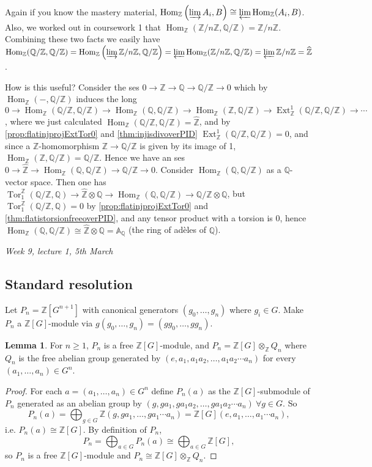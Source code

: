 \documentclass{article}
\newcommand{\A}{\mathbb{A}}
\newcommand{\Z}{\mathbb{Z}}
\newcommand{\Q}{\mathbb{Q}}
\newcommand{\Hom}{\operatorname{Hom}}
\newcommand{\Tor}{\operatorname{Tor}}
\newcommand{\Ext}{\operatorname{Ext}}
\newcommand{\zhat}{\widehat{\Z}}
\theoremstyle{definition}
\newtheorem{lemma}[defn]{Lemma}
\begin{document}
Again if you know the mastery material, $\Hom_\Z\left(\varinjlim A_i,B\right)\cong\varprojlim \Hom_\Z(A_i,B)$. Also, we worked out in coursework 1 that $\Hom_\Z(\Z/n\Z,\Q/\Z)=\Z/n\Z$. Combining these two facts we easily have $\Hom_\Z(\Q/\Z,\Q/\Z)=\Hom_\Z\left(\varinjlim\Z/n\Z,\Q/\Z\right)=\varprojlim \Hom_\Z(\Z/n\Z,\Q/\Z)=\varprojlim \Z/n\Z=\zhat$.

How is this useful? Consider the ses $0\rightarrow\Z\rightarrow\Q\rightarrow\Q/\Z\rightarrow 0$ which by $\Hom_\Z(-,\Q/\Z)$ induces the long $0\rightarrow\Hom_\Z(\Q/\Z,\Q/\Z)\rightarrow\Hom_\Z(\Q,\Q/\Z)\rightarrow\Hom_\Z(\Z,\Q/\Z)\rightarrow\Ext_\Z^1(\Q/\Z,\Q/\Z)\rightarrow\cdots$, where we just calculated $\Hom_\Z(\Q/\Z,\Q/\Z)=\zhat$, and by \ref{prop:flatinjprojExtTor0} and \ref{thm:injisdivoverPID} $\Ext_\Z^1(\Q/\Z,\Q/\Z)=0$, and since a $\Z$-homomorphism $\Z\rightarrow\Q/\Z$ is given by its image of 1, $\Hom_\Z(\Z,\Q/\Z)=\Q/\Z$. Hence we have an ses $0\rightarrow\zhat\rightarrow\Hom_\Z(\Q,\Q/\Z)\rightarrow\Q/\Z\rightarrow 0$. Consider $\Hom_\Z(\Q,\Q/\Z)$ as a $\Q$-vector space. Then one has $\Tor_1^\Z(\Q/\Z,\Q)\rightarrow\zhat\otimes\Q\rightarrow\Hom_\Z(\Q,\Q/\Z)\rightarrow\Q/\Z\otimes\Q$, but $\Tor_1^\Z(\Q/\Z,\Q)=0$ by \ref{prop:flatinjprojExtTor0} and \ref{thm:flatistorsionfreeoverPID}, and any tensor product with a torsion is 0, hence $\Hom_\Z(\Q,\Q/\Z)\cong\zhat\otimes\Q=\A_\Q$ (the ring of adèles of $\Q$).

\begin{flushright}
\textit{Week 9, lecture 1, 5th March}
\end{flushright}

\subsection{Standard resolution}

Let $P_n=\Z[G^{n+1}]$ with canonical generators $(g_0,\ldots,g_n)$ where $g_i\in G$. Make $P_n$ a $\Z[G]$-module via $g(g_0,\ldots,g_n)=(gg_0,\ldots,gg_n)$.

\begin{lemma}
For $n\geq 1$, $P_n$ is a free $\Z[G]$-module, and $P_n=\Z[G]\otimes_\Z Q_n$ where $Q_n$ is the free abelian group generated by $(e,a_1,a_1a_2,\ldots,a_1a_2\cdots a_n)$ for every $(a_1,\ldots,a_n)\in G^n$. 
\end{lemma}
\begin{proof}
For each $a=(a_1,\ldots,a_n)\in G^n$ define $P_n(a)$ as the $\Z[G]$-submodule of $P_n$ generated as an abelian group by $(g,ga_1,ga_1a_2,\ldots,ga_1a_2\cdots a_n) \ \forall g\in G$. So
\[
P_n(a)=\bigoplus_{g\in G}\Z (g,ga_1,\ldots,ga_1\cdots a_n)=\Z[G](e,a_1,\ldots,a_1\cdots a_n),
\]
i.e. $P_n(a)\cong \Z[G]$. By definition of $P_n$,
\[
P_n=\bigoplus_{a\in G}P_n(a)\cong\bigoplus_{a\in G}\Z[G],
\]
so $P_n$ is a free $\Z[G]$-module and $P_n\cong\Z[G]\otimes_\Z Q_n$.
\end{proof}
\end{document}
